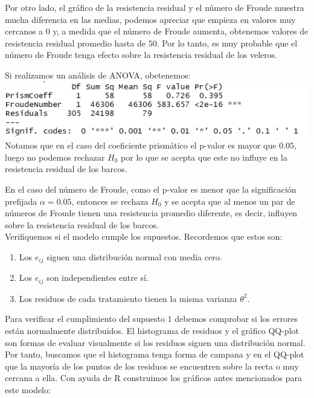 \documentclass[twoside]{article}
\begin{document}
\begin{multicols}{2}
Por otro lado, el gr\'afico de la resistencia residual y el n\'umero de Froude muestra mucha diferencia en las medias, podemos apreciar que empieza en valores muy cercanos a $0$ y, a medida que el n\'umero de Froude aumenta, obtenemos valores de resistencia residual promedio hasta de $50$. Por lo tanto, es muy probable que el n\'umero de Froude tenga efecto sobre la resistencia residual de los veleros.

Si realizamos un an\'alisis de ANOVA, obetenemos:\\

\includegraphics[scale = 0.4]{images/pic_14.png} \\

Notamos que en el caso del coeficiente prism\'atico el p-valor es mayor que $0.05$, luego no podemos rechazar $H_0$ por lo que se acepta que este no influye en la resistencia residual de los barcos.

En el caso del n\'umero de Froude, como el p-valor es menor que la significaci\'on prefijada $\alpha = 0.05$, entonces se rechaza $H_0$ y se acepta que al menos un par de n\'umeros de Froude tienen una resistencia promedio diferente, es decir, influyen sobre la resistencia residual de los barcos.\\

Verifiquemos si el modelo cumple los supuestos. Recordemos que estos son:
\begin{enumerate}
\item Los $e_{ij}$ siguen una distribuci\'on normal con media cero. 
\item Los $e_{ij}$ son independientes entre s\'i. 
\item Los residuos de cada tratamiento tienen la misma varianza $\theta^2$.\\
\end{enumerate}

Para verificar el cumplimiento del supuesto $1$ debemos comprobar si los errores est\'an normalmente distribuidos. El histograma de residuos y el gr\'afico QQ-plot son formas de evaluar visualmente si los residuos siguen una distribuci\'on normal. Por tanto, buscamos que el histograma tenga forma de campana y en el QQ-plot que la mayor\'ia de los puntos de los residuos se encuentren sobre la recta o muy cercana a ella. Con ayuda de R construimos los gr\'aficos antes mencionados para este modelo:\\


\end{multicols}
\end{document}
